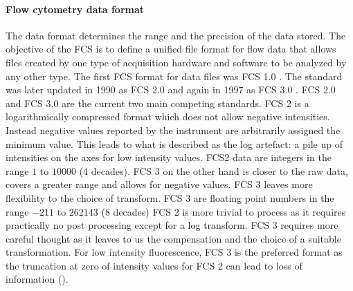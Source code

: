 \paragraph{Flow cytometry data format}
The data format determines the range and the precision of the data stored.
The objective of the \gls{FCS} is to define a unified file format for flow data
that allows files created by one type of acquisition hardware and software to be analyzed by any other type.
The first \gls{FCS} format for data files was FCS 1.0 \citep{Murphy:1984ev}.
The standard was later updated in 1990 as FCS 2.0 \citep{Anon:1990ce} and again in 1997 as FCS 3.0 \citep{Anonymous:vr}.
FCS 2.0 and FCS 3.0 are the current two main competing standards.
FCS 2 is a logarithmically compressed format which does not allow negative intensities.  
Instead negative values reported by the instrument are arbitrarily assigned the minimum value.
This leads to what is described as the log artefact: a pile up of intensities on the axes for low intensity values.
FCS2 data are integers in the range $1$ to $10000$ (4 decades).
FCS 3 on the other hand is closer to the raw data, covers a greater range and allows for negative values.
FCS 3 leaves more flexibility to the choice of transform.
FCS 3 are floating point numbers in the range $-211$ to $262143$ (8 decades)
FCS 2 is more trivial to process as it requires practically no post processing except for a log transform.
FCS 3 requires more careful thought as it leaves to us the compensation and the choice of a suitable transformation.
For low intensity fluorescence, FCS 3 is the preferred format as the truncation at zero of intensity values for FCS 2 can lead
to loss of information ().

